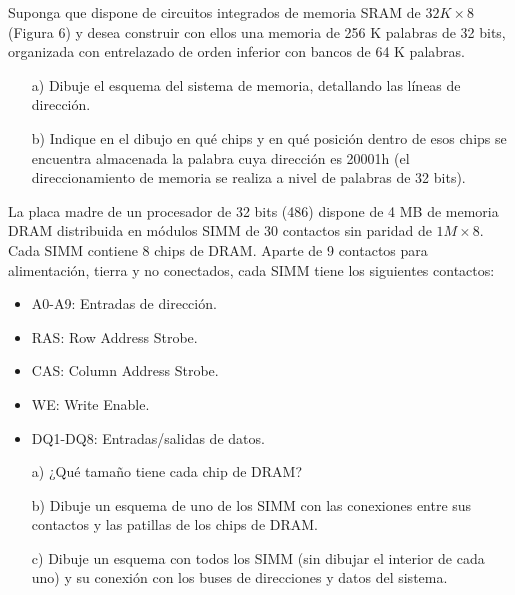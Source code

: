 \begin{ejercicio}
    Suponga que dispone de circuitos integrados de memoria SRAM de \( 32K \times 8 \) (Figura 6) y desea construir con ellos una memoria de 256 K palabras de 32 bits, organizada con entrelazado de orden inferior con bancos de 64 K palabras.
    \begin{itemize}
        \item[a)] Dibuje el esquema del sistema de memoria, detallando las líneas de dirección.
        \item[b)] Indique en el dibujo en qué chips y en qué posición dentro de esos chips se encuentra almacenada la palabra cuya dirección es 20001h (el direccionamiento de memoria se realiza a nivel de palabras de 32 bits).
    \end{itemize}
\end{ejercicio}

\begin{ejercicio}
    La placa madre de un procesador de 32 bits (486) dispone de 4 MB de memoria DRAM distribuida en módulos SIMM de 30 contactos sin paridad de \( 1M \times 8 \). Cada SIMM contiene 8 chips de DRAM. Aparte de 9 contactos para alimentación, tierra y no conectados, cada SIMM tiene los siguientes contactos:
    \begin{itemize}
        \item A0-A9: Entradas de dirección.
        \item RAS: Row Address Strobe.
        \item CAS: Column Address Strobe.
        \item WE: Write Enable.
        \item DQ1-DQ8: Entradas/salidas de datos.
    \end{itemize}
    \begin{itemize}
        \item[a)] ¿Qué tamaño tiene cada chip de DRAM?
        \item[b)] Dibuje un esquema de uno de los SIMM con las conexiones entre sus contactos y las patillas de los chips de DRAM.
        \item[c)] Dibuje un esquema con todos los SIMM (sin dibujar el interior de cada uno) y su conexión con los buses de direcciones y datos del sistema.
    \end{itemize}
\end{ejercicio}

